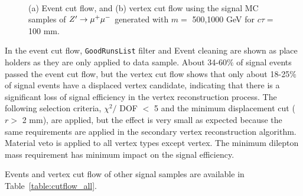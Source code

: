 \begin{figure}[!htb]
    \centering
     \\
    \caption{(a) Event cut flow, and (b) vertex cut flow using the signal MC samples of $Z'\rightarrow \mu^{+}\mu^{-}$ generated with $m =$ 500,1000 GeV for $c\tau= $ 100 mm.}
    \label{fig:signal_cutflow_MC_mumu}
\end{figure}

In the event cut flow, \texttt{GoodRunsList} filter and Event cleaning are shown as place holders as they are only applied to data sample. About 34-60$\%$ of signal events passed the event cut flow, but the vertex cut flow shows that only about 18-25$\%$ of signal events have a displaced vertex candidate, indicating that there is a significant loss of signal efficiency in the vertex reconstruction process. The following selection criteria, $\chi^{2} /$ DOF $<$ 5 and the minimum displacement cut ($r > $ 2 mm), are applied, but the effect is very small as expected because the same requirements are applied in the secondary vertex reconstruction algorithm. Material veto is applied to all vertex types except \mumu vertex. The minimum dilepton mass requirement has minimum impact on the signal efficiency.

Events and vertex cut flow of other signal samples are available in Table~\ref{table:cutflow_all}.



